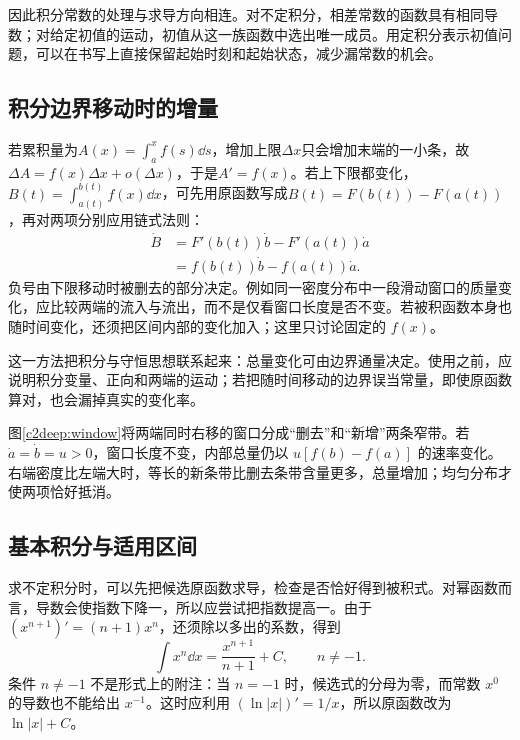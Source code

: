 因此积分常数的处理与求导方向相连。对不定积分，相差常数的函数具有相同导数；对给定初值的运动，初值从这一族函数中选出唯一成员。用定积分表示初值问题，可以在书写上直接保留起始时刻和起始状态，减少漏常数的机会。

\subsection{积分边界移动时的增量}
若累积量为$A(x)=\int_a^x f(s)\dd s$，增加上限$\Delta x$只会增加末端的一小条，故$\Delta A=f(x)\Delta x+o(\Delta x)$，于是$A'=f(x)$。若上下限都变化，$B(t)=\int_{a(t)}^{b(t)}f(x)\dd x$，可先用原函数写成$B(t)=F(b(t))-F(a(t))$，再对两项分别应用链式法则：
\begin{align*}
\dot B
&=F'(b(t))\dot b-F'(a(t))\dot a\\
&=f(b(t))\dot b-f(a(t))\dot a.
\end{align*}
负号由下限移动时被删去的部分决定。例如同一密度分布中一段滑动窗口的质量变化，应比较两端的流入与流出，而不是仅看窗口长度是否不变。若被积函数本身也随时间变化，还须把区间内部的变化加入；这里只讨论固定的 $f(x)$。

这一方法把积分与守恒思想联系起来：总量变化可由边界通量决定。使用之前，应说明积分变量、正向和两端的运动；若把随时间移动的边界误当常量，即使原函数算对，也会漏掉真实的变化率。



图\ref{c2deep:window}将两端同时右移的窗口分成“删去”和“新增”两条窄带。若 $\dot a=\dot b=u>0$，窗口长度不变，内部总量仍以 $u[f(b)-f(a)]$ 的速率变化。右端密度比左端大时，等长的新条带比删去条带含量更多，总量增加；均匀分布才使两项恰好抵消。


\subsection{基本积分与适用区间}
求不定积分时，可以先把候选原函数求导，检查是否恰好得到被积式。对幂函数而言，导数会使指数下降一，所以应尝试把指数提高一。由于 $(x^{n+1})'=(n+1)x^n$，还须除以多出的系数，得到
\[
 \int x^n\dd x=\frac{x^{n+1}}{n+1}+C,\qquad n\ne-1.
\]
条件 $n\ne-1$ 不是形式上的附注：当 $n=-1$ 时，候选式的分母为零，而常数 $x^0$ 的导数也不能给出 $x^{-1}$。这时应利用 $(\ln|x|)'=1/x$，所以原函数改为 $\ln|x|+C$。

